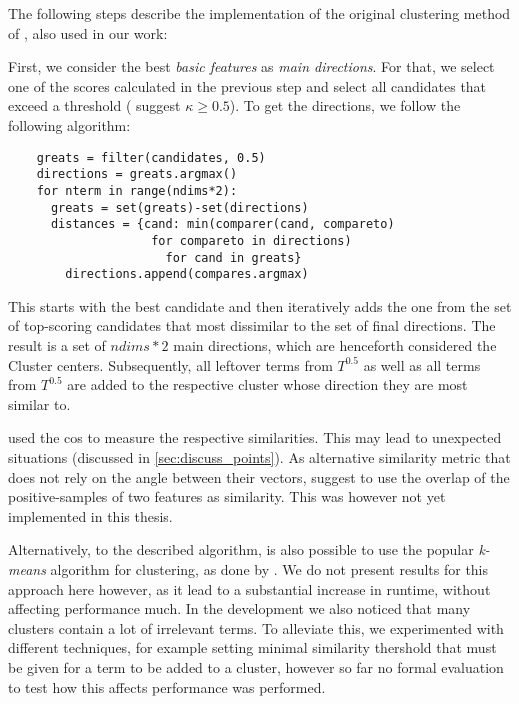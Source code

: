 The following steps describe the implementation of the original clustering method of \textcite{Derrac2015}, also used in our work:

First, we consider the best \textit{basic features} as \textit{main directions}. For that, we select one of the scores calculated in the previous step and select all candidates that exceed a threshold (\cite{Derrac2015} suggest $\kappa \geq 0.5$).
To get the directions, we follow the following algorithm:

\vspace{-2ex}
\begingroup
\verbatimfont{\footnotesize}%
\begin{verbatim}
	greats = filter(candidates, 0.5)
	directions = greats.argmax()
	for nterm in range(ndims*2):
	  greats = set(greats)-set(directions)
	  distances = {cand: min(comparer(cand, compareto) 
	                for compareto in directions) 
	                  for cand in greats}
		directions.append(compares.argmax)
\end{verbatim}
\endgroup
\vspace{-2ex}

This starts with the best candidate and then iteratively adds the one from the set of top-scoring candidates that most dissimilar to the set of final directions. The result is a set of $ndims*2$ main directions, which are henceforth considered the Cluster centers. Subsequently, all leftover terms from $T^{0.5}$ as well as all terms from $T^{0.5}$ are added to the respective cluster whose direction they are most similar to. 

\textcite{Derrac2015} used the \gls{cos} to measure the respective similarities. This may lead to unexpected situations (discussed in \autoref{sec:discuss_points}). As alternative similarity metric that does not rely on the angle between their vectors, \cite{Alshaikh2019} suggest to use the overlap of the positive-samples of two features as similarity. This was however not yet implemented in this thesis.

Alternatively, to the described algorithm, is also possible to use the popular \textit{k-means} algorithm for clustering, as done by \cite{Ager2018}. We do not present results for this approach here however, as it lead to a substantial increase in runtime, without affecting performance much. In the development we also noticed that many clusters contain a lot of irrelevant terms. To alleviate this, we experimented with different techniques, for example setting minimal similarity thershold that must be given for a term to be added to a cluster, however so far no formal evaluation to test how this affects performance was performed.


